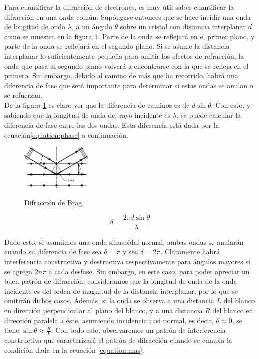 \documentclass[%
 reprint,
 amsmath,amssymb,
 aps,
]{revtex4-1}
\begin{document}
Para cuantificar la difracción de electrones, es muy útil saber cuantificar la difracción en una onda común. Supóngase entonces que se hace incidir una onda de longitud de onda $\lambda$, a un ángulo $\theta$ sobre un cristal con distancia interplanar $d$ como se muestra en la figura \ref{fig:difraccion}. Parte de la onda se reflejará en el primer plano, y parte de la onda se reflejará en el segundo plano. Si se asume la distancia interplanar lo suficientemente pequeña para omitir los efectos de refracción, la onda que pasa al segundo plano volverá a encontrarse con la que se refleja en el primero. Sin embargo, debido al camino de más que ha recorrido, habrá una diferencia de fase que será importante para determinar si estas ondas se anulan o se refuerzan.\\


De la figura \ref{fig:difraccion} es claro ver que la diferencia de caminos es de $d\sin{\theta}$. Con esto, y sabiendo que la longitud de onda del rayo incidente es $\lambda$, se puede calcular la diferencia de fase entre las dos ondas. Esta diferencia está dada por la ecuación\ref{equation:phase} a continuación.\\

\begin{figure}[h!]
\caption{Difracción de Brag}
\centering
\includegraphics[width=0.30\textwidth]{difraction}
\label{fig:difraccion}
\end{figure}



\begin{equation}
\delta = \frac{2\pi d\sin{\theta}}{\lambda}
\label{equation:phase}
\end{equation}

Dado esto, si asumimos una onda sinusoidal normal, ambas ondas se anularán cuando su diferencia de fase sea $\delta = \pi$ y sea $\delta = 2\pi$. Claramente habrá interferencia constructiva y destructiva respectivamente para ángulos mayores si se agrega $2n\pi$ a cada desfase. Sin embargo, en este caso, para poder apreciar un buen patrón de difracción, consideramos que la longitud de onda de la onda incidente es del orden de magnitud de la distancia interplanar, por lo que se omitirán dichos casos. Además, si la onda se observa a una distancia $L$ del blanco en dirección perpendicular al plano del blanco, y a una distancia $R$ del blanco en dirección paralela a éste, asumiendo incidencia casi normal, es decir, $\theta \approx 0$, se tiene $\sin{\theta} \approx \frac{R}{L}$. Con todo esto, observaremos un patrón de interferencia constructiva que caracterizará el patrón de difracción cuando se cumpla la condición dada en la ecuación \ref{equation:mas}.\\
\end{document}

